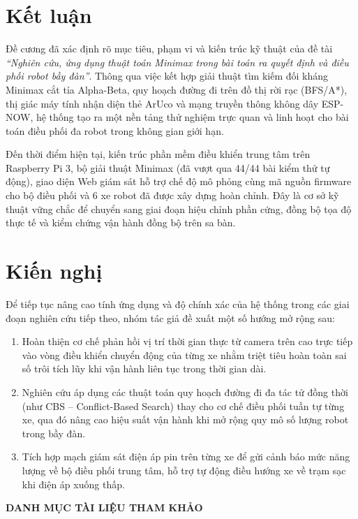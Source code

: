 \documentclass[12pt,a4paper]{report}
\begin{document}
	\section*{Kết luận}
	Đề cương đã xác định rõ mục tiêu, phạm vi và kiến trúc kỹ thuật của đề tài \textit{``Nghiên cứu, ứng dụng thuật toán Minimax trong bài toán ra quyết định và điều phối robot bầy đàn''}. Thông qua việc kết hợp giải thuật tìm kiếm đối kháng Minimax cắt tỉa Alpha-Beta, quy hoạch đường đi trên đồ thị rời rạc (BFS/A*), thị giác máy tính nhận diện thẻ ArUco và mạng truyền thông không dây ESP-NOW, hệ thống tạo ra một nền tảng thử nghiệm trực quan và linh hoạt cho bài toán điều phối đa robot trong không gian giới hạn.
	
	Đến thời điểm hiện tại, kiến trúc phần mềm điều khiển trung tâm trên Raspberry Pi 3, bộ giải thuật Minimax (đã vượt qua 44/44 bài kiểm thử tự động), giao diện Web giám sát hỗ trợ chế độ mô phỏng cùng mã nguồn firmware cho bộ điều phối và 6 xe robot đã được xây dựng hoàn chỉnh. Đây là cơ sở kỹ thuật vững chắc để chuyển sang giai đoạn hiệu chỉnh phần cứng, đồng bộ tọa độ thực tế và kiểm chứng vận hành đồng bộ trên sa bàn.
	
	\section*{Kiến nghị}
	Để tiếp tục nâng cao tính ứng dụng và độ chính xác của hệ thống trong các giai đoạn nghiên cứu tiếp theo, nhóm tác giả đề xuất một số hướng mở rộng sau:
	\begin{enumerate}[leftmargin=1.2cm]
		\item Hoàn thiện cơ chế phản hồi vị trí thời gian thực từ camera trên cao trực tiếp vào vòng điều khiển chuyển động của từng xe nhằm triệt tiêu hoàn toàn sai số trôi tích lũy khi vận hành liên tục trong thời gian dài.
		\item Nghiên cứu áp dụng các thuật toán quy hoạch đường đi đa tác tử đồng thời (như CBS -- Conflict-Based Search) thay cho cơ chế điều phối tuần tự từng xe, qua đó nâng cao hiệu suất vận hành khi mở rộng quy mô số lượng robot trong bầy đàn.
		\item Tích hợp mạch giám sát điện áp pin trên từng xe để gửi cảnh báo mức năng lượng về bộ điều phối trung tâm, hỗ trợ tự động điều hướng xe về trạm sạc khi điện áp xuống thấp.
	\end{enumerate}
	
	\clearpage
	\pagestyle{empty}
	\begin{center}
		{\fontsize{15pt}{20pt}\selectfont\textbf{DANH MỤC TÀI LIỆU THAM KHẢO}}
	\end{center}
	\vspace{0.4cm}
	
\end{document}
